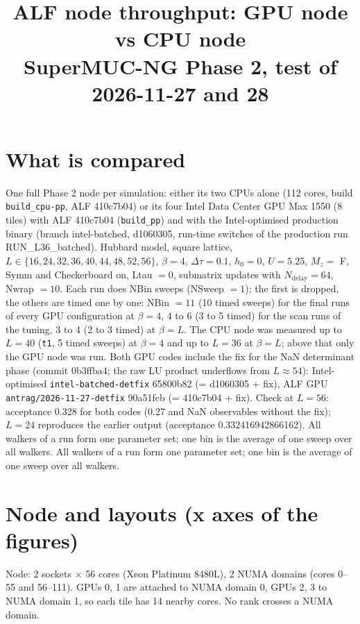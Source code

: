 \documentclass[11pt,a4paper]{article}
\title{ALF node throughput: GPU node vs CPU node\\\large SuperMUC-NG Phase 2, test of 2026-11-27 and 28}
\author{}
\date{\DataState}
\begin{document}
\maketitle
\begin{center}\end{center}

\section{What is compared}
One full Phase 2 node per simulation: either its two CPUs alone (112 cores, build \texttt{build\_cpu-pp}, ALF 410c7b04)
or its four Intel Data Center GPU Max 1550 (8 tiles) with ALF 410c7b04 (\texttt{build\_pp}) and with the Intel-optimised
production binary (branch intel-batched, d1060305, run-time switches of the production run RUN\_L36\_batched).
Hubbard model, square lattice, $L\in\{16,24,32,36,40,44,48,52,56\}$, $\beta=4$, $\Delta\tau=0.1$, $h_0=0$, $U=5.25$, $M_z=$ F,
Symm and Checkerboard on, Ltau $=0$, submatrix updates with $N_\text{delay}=64$, Nwrap $=10$.
Each run does NBin sweeps (NSweep $=1$); the first is dropped, the others are timed one by one: NBin $=11$ (10 timed sweeps) for the final runs of every GPU configuration at $\beta=4$, 4 to 6 (3 to 5 timed) for the scan runs of the tuning, 3 to 4 (2 to 3 timed) at $\beta=L$. The CPU node was measured up to $L=40$ (\texttt{t1}, 5 timed sweeps) at $\beta=4$ and up to $L=36$ at $\beta=L$; above that only the GPU node was run.
Both GPU codes include the fix for the NaN determinant phase (commit 0b3ffba4; the raw LU product underflows from $L\approx54$): Intel-optimised \texttt{intel-batched-detfix} 65800b82 (= d1060305 + fix), ALF GPU \texttt{antrag/2026-11-27-detfix} 90a51fcb (= 410c7b04 + fix). Check at $L=56$: acceptance 0.328 for both codes (0.27 and NaN observables without the fix); $L=24$ reproduces the earlier output (acceptance 0.332416942866162).
All walkers of a run form one parameter set; one bin is the average of one sweep over all walkers.
All walkers of a run form one parameter set; one bin is the average of one sweep over all walkers.

\section{Node and layouts (x axes of the figures)}
Node: 2 sockets $\times$ 56 cores (Xeon Platinum 8480L), 2 NUMA domains (cores 0--55 and 56--111). GPUs 0, 1 are
attached to NUMA domain 0, GPUs 2, 3 to NUMA domain 1, so each tile has 14 nearby cores. No rank crosses a NUMA domain.
\end{document}

